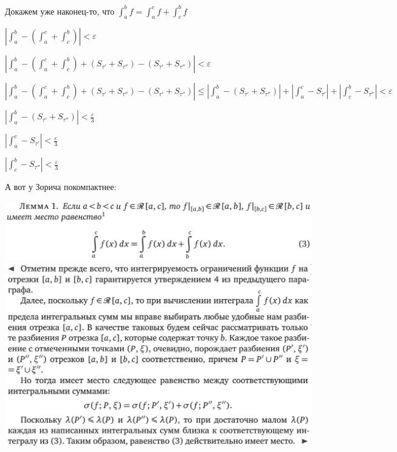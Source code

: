 \documentclass[a4paper]{article}
\begin{document}
\begin{definit}
Докажем уже наконец-то, что $\displaystyle \int_a^b f = \int_a^c f + \int_c^b f $

$\displaystyle \left| \int_a^b - \left( \int_a^c + \int_c^b \right) \right| < \varepsilon$

$\displaystyle \left| \int_a^b - \left( \int_a^c + \int_c^b \right) + \left( S_{\tau'} + S_{\tau''} \right) - (S_{\tau'} + S_{\tau''}) \right| < \varepsilon$

$\displaystyle \left| \int_a^b - \left( \int_a^c + \int_c^b \right) + \left( S_{\tau'} + S_{\tau''} \right) - (S_{\tau'} + S_{\tau''}) \right| \leq \left| \int_a^b -  (S_{\tau'} + S_{\tau''}) \right| + \left| \int_a^c - S_{\tau'} \right| + \left| \int_c^b - S_{\tau''} \right| <\varepsilon$

$\left| \int_a^b - ( S_{\tau'} + S_{\tau''}) \right| < \frac{\varepsilon}{3}$

$ \left| \int_a^c - S_{\tau'} \right| < \frac{\varepsilon}{3}$

$\left| \int_c^b - S_{\tau''} \right| < \frac{\varepsilon}{3}$


А вот у Зорича покомпактнее:

\includegraphics[width=18cm]{zorich1.png}
\includegraphics[width=18cm]{zorich2.png}
\end{definit}
\end{document}
